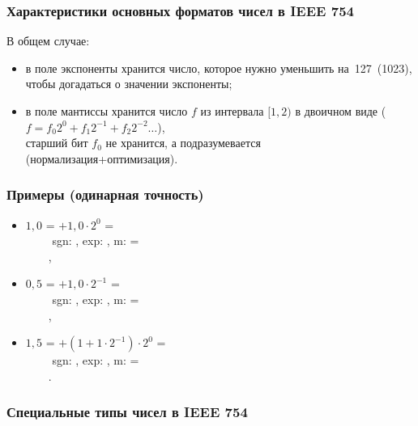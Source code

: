 \begin{frame}[plain]
\frametitle{Характеристики основных форматов чисел в IEEE 754}
\vspace{-.3cm}\vspace{-.4cm}
\pause\small В общем случае:
\begin{itemize}
    \item \vspace{-.1cm} в поле экспоненты хранится число, которое нужно уменьшить на~127~(1023), чтобы догадаться о значении экспоненты;
    \pause\item \vspace{-.1cm} в поле мантиссы хранится число $f$ из интервала $[1,2)$ в двоичном виде ($f = f_0 2^0 + f_1 2^{-1} + f_2 2^{-2} \ldots$)\pause, \\ старший бит $f_0$ не хранится, а подразумевается (нормализация+оптимизация).
\end{itemize}
\end{frame}

\begin{frame}
\frametitle{Примеры (одинарная точность)}
\begin{itemize}
    \item $1,0$ = \pause $+ 1,0 \cdot 2^0$ = \pause
        \\$\qquad$
            sgn: , exp: , m:  = \pause
        \\$\qquad$,
    \item \pause $0,5$ = \pause
        $+ 1,0 \cdot 2^{-1}$ = \pause
        \\$\qquad$
            sgn: , exp: , m:  = \pause
        \\$\qquad$,
    \item \pause $1,5$ = \pause
        $+ (1 + 1\cdot2^{-1} ) \cdot 2^0$ =\pause
        \\$\qquad$
            sgn: , exp: , m:  = \pause
        \\$\qquad$.
\end{itemize}
\end{frame}

\begin{frame}
\frametitle{Специальные типы чисел в IEEE 754}
\end{frame}


